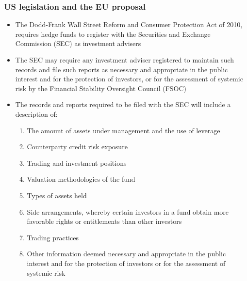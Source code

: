 \documentclass[11pt]{beamer}
\begin{document}
\begin{frame}
\frametitle{US legislation and the EU proposal}
\begin{itemize}
\item The Dodd-Frank Wall Street Reform and Consumer Protection Act of 2010, requires hedge funds to register with the Securities and Exchange Commission (SEC) as investment advisers
\item The SEC may require any investment adviser registered to maintain such records and file such reports as necessary and appropriate in the public interest and for the protection of investors, or for the assessment of systemic risk by the Financial Stability Oversight Council (FSOC)
\end{itemize}
\end{frame}

\begin{frame}
\begin{itemize}
\item The records and reports required to be filed with the SEC will include a description of:
\begin{enumerate}
\item The amount of assets under management and the use of leverage
\item Counterparty credit risk exposure
\item Trading and investment positions
\item Valuation methodologies of the fund
\item Types of assets held
\item Side arrangements, whereby certain investors in a fund obtain more favorable rights or entitlements than other investors
\item Trading practices
\item Other information deemed necessary and appropriate in the public interest and for the protection of investors or for the assessment of systemic risk
\end{enumerate}
\end{itemize}
\end{frame}
\end{document}
